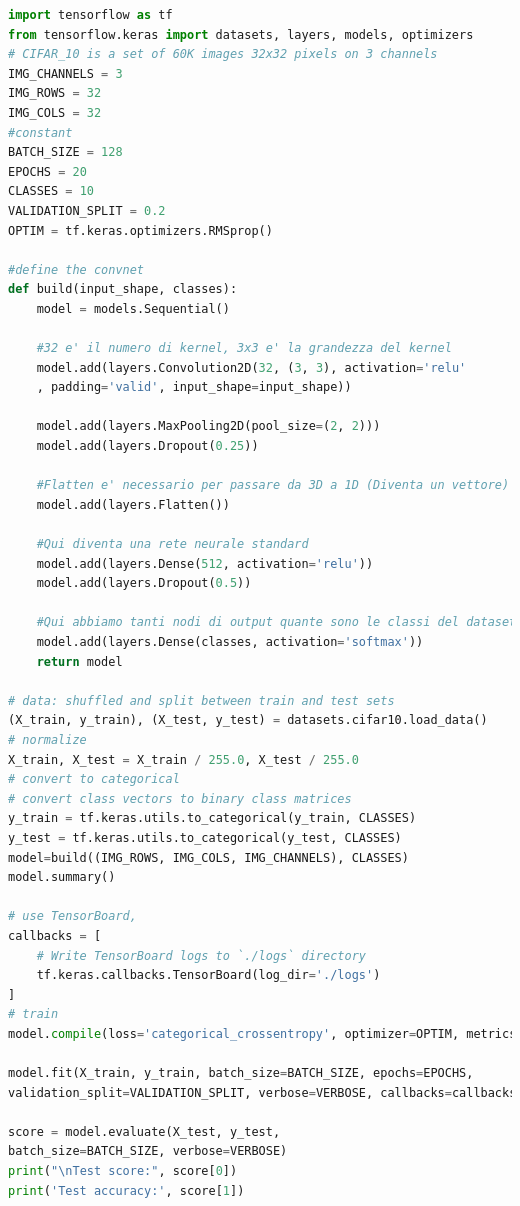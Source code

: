 \begin{lstlisting}[language=Python]
import tensorflow as tf
from tensorflow.keras import datasets, layers, models, optimizers
# CIFAR_10 is a set of 60K images 32x32 pixels on 3 channels
IMG_CHANNELS = 3
IMG_ROWS = 32
IMG_COLS = 32
#constant
BATCH_SIZE = 128
EPOCHS = 20
CLASSES = 10
VALIDATION_SPLIT = 0.2
OPTIM = tf.keras.optimizers.RMSprop()

#define the convnet
def build(input_shape, classes):
    model = models.Sequential()

    #32 e' il numero di kernel, 3x3 e' la grandezza del kernel
    model.add(layers.Convolution2D(32, (3, 3), activation='relu'
    , padding='valid', input_shape=input_shape))

    model.add(layers.MaxPooling2D(pool_size=(2, 2)))
    model.add(layers.Dropout(0.25))

    #Flatten e' necessario per passare da 3D a 1D (Diventa un vettore)
    model.add(layers.Flatten())

    #Qui diventa una rete neurale standard
    model.add(layers.Dense(512, activation='relu'))
    model.add(layers.Dropout(0.5))

    #Qui abbiamo tanti nodi di output quante sono le classi del dataset
    model.add(layers.Dense(classes, activation='softmax'))
    return model

# data: shuffled and split between train and test sets
(X_train, y_train), (X_test, y_test) = datasets.cifar10.load_data()
# normalize
X_train, X_test = X_train / 255.0, X_test / 255.0
# convert to categorical
# convert class vectors to binary class matrices
y_train = tf.keras.utils.to_categorical(y_train, CLASSES)
y_test = tf.keras.utils.to_categorical(y_test, CLASSES)
model=build((IMG_ROWS, IMG_COLS, IMG_CHANNELS), CLASSES)
model.summary()

# use TensorBoard,
callbacks = [
    # Write TensorBoard logs to `./logs` directory
    tf.keras.callbacks.TensorBoard(log_dir='./logs')
]
# train
model.compile(loss='categorical_crossentropy', optimizer=OPTIM, metrics=['accuracy'])

model.fit(X_train, y_train, batch_size=BATCH_SIZE, epochs=EPOCHS, 
validation_split=VALIDATION_SPLIT, verbose=VERBOSE, callbacks=callbacks)

score = model.evaluate(X_test, y_test,
batch_size=BATCH_SIZE, verbose=VERBOSE)
print("\nTest score:", score[0])
print('Test accuracy:', score[1])

\end{lstlisting}

